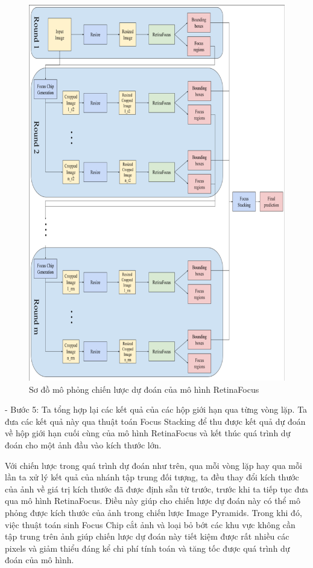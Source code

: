 {    \begin{figure}[H]
        \centering
        \includegraphics[width=15cm, trim={0.1cm 0.1cm 0.1cm 0.1cm}, clip] {images/retinafocus_infer_strategy}
        \caption{Sơ đồ mô phỏng chiến lược dự đoán của mô hình RetinaFocus}
        \label{fig:retinafocus_infer_strategy}
    \end{figure}
    
    \noindent
    - Bước 5: Ta tổng hợp lại các kết quả của các hộp giới hạn qua từng vòng lặp.
    Ta đưa các kết quả này qua thuật toán Focus Stacking để thu được kết quả dự đoán về hộp giới hạn cuối cùng của mô hình RetinaFocus và kết thúc quá trình dự đoán cho một ảnh đầu vào kích thước lớn.

    \noindent
    Với chiến lược trong quá trình dự đoán như trên, qua mỗi vòng lặp hay qua mỗi lần ta xử lý kết quả của nhánh tập trung đối tượng, ta đều thay đổi kích thước của ảnh về giá trị kích thước đã được định sẵn từ trước, trước khi ta tiếp tục đưa qua mô hình RetinaFocus.
    Điều này giúp cho chiến lược dự đoán này có thể mô phỏng được kích thước của ảnh trong chiến lược Image Pyramids.
    Trong khi đó, việc thuật toán sinh Focus Chip cắt ảnh và loại bỏ bớt các khu vực không cần tập trung trên ảnh giúp chiến lược dự đoán này tiết kiệm được rất nhiều các pixels và giảm thiểu đáng kể chi phí tính toán và tăng tốc được quá trình dự đoán của mô hình.

}
